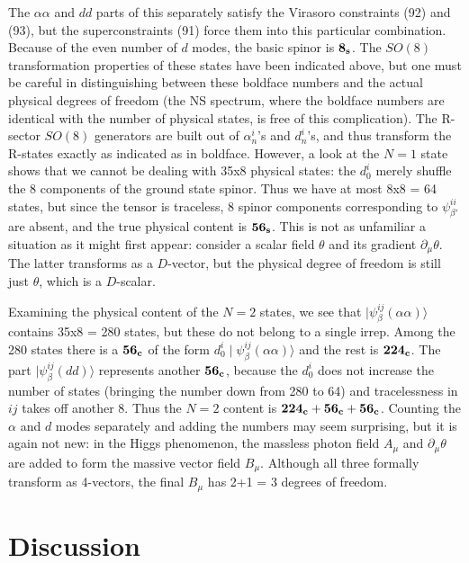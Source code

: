 \documentclass[a4paper,a4paper]{article}
\begin{document}
The $\alpha \alpha$ and $dd$ parts of this separately satisfy the
Virasoro constraints (92) and (93), but the superconstraints (91) force
them into this particular combination. Because of the even number
of $d$ modes, the basic spinor is ${\bf 8_{s}}$.
The $SO(8)$ transformation properties of these states have been indicated
above, but one must be careful in distinguishing between these boldface
numbers and the actual physical degrees of freedom (the
NS spectrum, where the boldface numbers are identical with the
number of physical states, is free of this complication).
The R-sector $SO(8)$ generators are built out of $\alpha^{i}_{n}$'s
and $d^{i}_{n}$'s, and thus transform the R-states exactly as indicated as
in boldface.  However, a look at the $N=1$ state shows that we cannot be
dealing with 35x8 physical states: the $d^{i}_{0}$ merely shuffle the 8
components of the ground state spinor.  Thus we have at most 8x8 = 64
states, but since the tensor is traceless, 8 spinor components
corresponding to $\psi^{ii}_{\beta'}$ are absent, and the true physical
content is ${\bf {56}_{s}}$.  This is not as unfamiliar a situation as it
might first appear: consider a scalar field $\theta$ and its gradient
$\partial_{\mu}\theta$.  The latter transforms as a $D$-vector, but the
physical degree of freedom is still just $\theta$, which is a $D$-scalar.

Examining the physical content of the $N=2$ states, we see that
$\mid\psi^{ij}_{\beta}(\alpha \alpha)\rangle$ contains 35x8 = 280 states,
but these do not belong to a single irrep.  Among the 280 states there is
a ${\bf {56}_c}$ of the form $d^{i}_{0}\mid\psi^{ij}_{\beta}(\alpha
\alpha)\rangle$ and the rest is ${\bf {224}_c}$.  The part
$\mid\psi^{ij}_{\beta}(dd)\rangle $ represents another ${\bf {56}_c}$,
because the $d^{i}_{0}$ does not increase the number of states
(bringing the number down from 280 to 64) and tracelessness in $ij$
takes off another 8.  Thus the $N=2$ content is ${\bf {224}_c}+{\bf
{56}_c} + {\bf {56}_c}$.  Counting the $\alpha$ and $d$ modes separately
and adding the numbers may seem surprising, but it is again not new: in
the Higgs phenomenon, the massless photon field $A_{\mu}$ and
$\partial_{\mu}\theta$ are added to form the massive vector
field $B_{\mu}$.  Although all three formally transform as 4-vectors,
the final $B_{\mu}$ has 2+1 = 3 degrees of freedom.

\section{Discussion}
\end{document}
